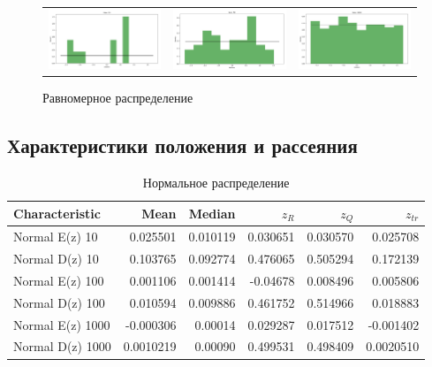 \begin{figure}[H]
	\centering
	\begin{tabular}{ccc}
		\includegraphics[width=55mm, height =0.25\textheight]{pics/u10.jpg}
		&
		\includegraphics[width=55mm, height =0.25\textheight]{pics/u50.jpg}
		&
		\includegraphics[width=55mm, height =0.25\textheight]{pics/u1000.jpg}
	\end{tabular}
	\caption{Равномерное распределение}
	\label{fig:uniform}
\end{figure}

\subsection{Характеристики положения и рассеяния}
\begin{table}[H]
	\centering
	\begin{tabular}[t]{lrrrrr}
		\hline
		Characteristic   &      Mean &    Median &       $z_R$ &      $z_Q$ &      $z_{tr}$ \\
		\hline
		Normal E(z) 10   &  0.025501 &  0.010119 &  0.030651 & 0.030570 &  0.025708 \\
		Normal D(z) 10   &  0.103765 &  0.092774 &  0.476065 & 0.505294 &  0.172139 \\
		Normal E(z) 100  & 0.001106 & 0.001414  &  -0.04678 & 0.008496 & 0.005806 \\
		Normal D(z) 100  &  0.010594 &  0.009886  &  0.461752 & 0.514966 &  0.018883 \\
		Normal E(z) 1000 & -0.000306 & 0.00014  & 0.029287  & 0.017512 & -0.001402 \\
		Normal D(z) 1000 &  0.0010219 &  0.00090 &  0.499531  & 0.498409 &  0.0020510 \\
		\hline
	\end{tabular}
	\caption{Нормальное распределение}
	\label{tab:normal}
\end{table}

